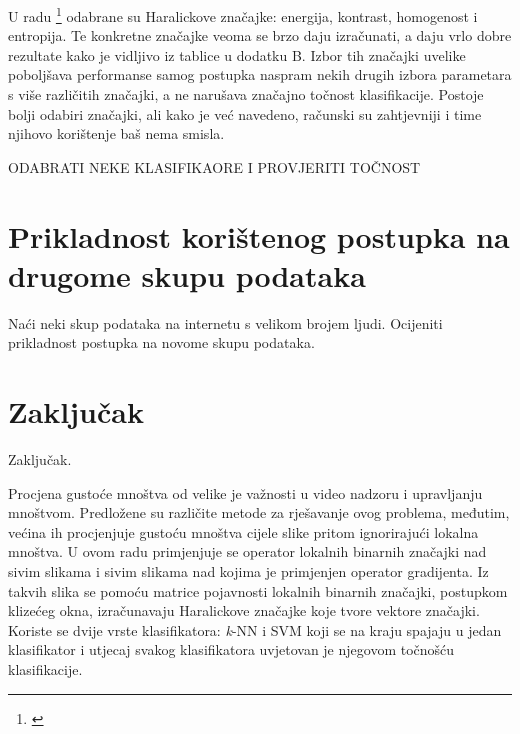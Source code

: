 \documentclass[times, utf8, zavrsni]{fer}
\begin{document}
\bigbreak

U radu \footnote{\cite{6266412}} odabrane su Haralickove značajke: energija, kontrast,
homogenost i entropija. Te konkretne značajke veoma se brzo daju izračunati, a daju 
vrlo dobre rezultate kako je vidljivo iz tablice u dodatku B. Izbor tih značajki uvelike poboljšava
performanse samog postupka naspram nekih drugih izbora parametara s više različitih značajki, a
ne narušava značajno točnost klasifikacije. Postoje bolji odabiri značajki, ali kako je već navedeno, 
računski su zahtjevniji i time njihovo korištenje baš nema smisla. 

\bigbreak

ODABRATI NEKE KLASIFIKAORE I PROVJERITI TOČNOST


\chapter{Prikladnost korištenog postupka na drugome skupu podataka}

Naći neki skup podataka na internetu s velikom brojem ljudi.
\newline
Ocijeniti prikladnost postupka na novome skupu podataka.




\chapter{Zaključak}
Zaključak.




\listoffigures
\listoftables

\begin{sazetak}
Procjena gustoće mnoštva od velike je važnosti u video nadzoru i upravljanju mnoštvom. Predložene
su različite metode za rješavanje ovog problema, međutim, većina ih procjenjuje gustoću mnoštva
cijele slike pritom ignorirajući lokalna mnoštva. U ovom radu primjenjuje se operator lokalnih binarnih
značajki nad sivim slikama i sivim slikama nad kojima je primjenjen operator gradijenta. Iz takvih slika
se pomoću matrice pojavnosti lokalnih binarnih značajki, postupkom klizećeg okna, izračunavaju
 Haralickove značajke koje tvore vektore značajki. Koriste se dvije vrste klasifikatora: \textit{k}-NN i SVM koji 
se na kraju spajaju u jedan klasifikator i utjecaj svakog klasifikatora uvjetovan je njegovom točnošću 
klasifikacije.

\end{sazetak}
\end{document}
